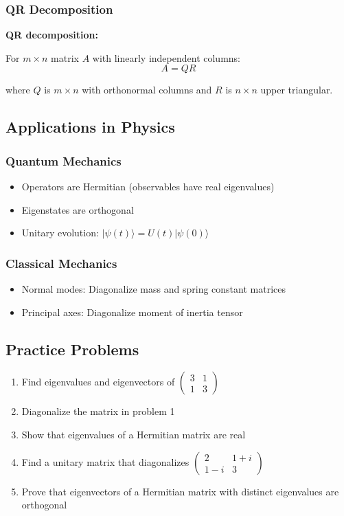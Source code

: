 \documentclass[12pt,a4paper]{article}
\begin{document}
\subsubsection{QR Decomposition}
\begin{formulabox}
\textbf{QR decomposition:}

For $m \times n$ matrix $A$ with linearly independent columns:
\begin{equation}
A = QR
\end{equation}

where $Q$ is $m \times n$ with orthonormal columns and $R$ is $n \times n$ upper triangular.
\end{formulabox}

\subsection{Applications in Physics}
\subsubsection{Quantum Mechanics}
\begin{itemize}
    \item Operators are Hermitian (observables have real eigenvalues)
    \item Eigenstates are orthogonal
    \item Unitary evolution: $|\psi(t)\rangle = U(t)|\psi(0)\rangle$
\end{itemize}

\subsubsection{Classical Mechanics}
\begin{itemize}
    \item Normal modes: Diagonalize mass and spring constant matrices
    \item Principal axes: Diagonalize moment of inertia tensor
\end{itemize}

\subsection{Practice Problems}
\begin{enumerate}
    \item Find eigenvalues and eigenvectors of $\begin{pmatrix} 3 & 1 \\ 1 & 3 \end{pmatrix}$
    \item Diagonalize the matrix in problem 1
    \item Show that eigenvalues of a Hermitian matrix are real
    \item Find a unitary matrix that diagonalizes $\begin{pmatrix} 2 & 1+i \\ 1-i & 3 \end{pmatrix}$
    \item Prove that eigenvectors of a Hermitian matrix with distinct eigenvalues are orthogonal
\end{enumerate}
\end{document}
